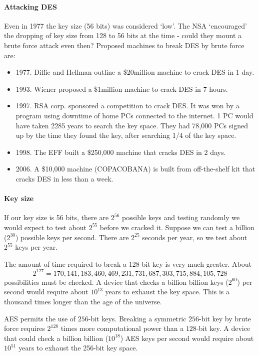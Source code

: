 \documentclass[a4paper, 11pt, openany]{book}
\numberwithin{equation}{section}
\theoremstyle{plain}
\theoremstyle{definition}
\begin{document}
\paragraph{Attacking DES}
Even in 1977 the key size (56 bits) was considered ‘low’.
The NSA ‘encouraged’ the dropping of key size from 128 to 56 bits at the time - could they mount a brute force attack even then?
Proposed machines to break DES by brute force are:
\begin{itemize}
    \item 1977. Diffie and Hellman outline a \$20million machine to crack DES in 1 day.
    
    \item 1993. Wiener proposed a \$1million machine to crack DES in 7 hours.
    
    \item 1997. RSA corp. sponsored a competition to crack DES. It was won by a program using downtime of home PCs connected to the internet. 1 PC would have taken 2285 years to search the key space. They had 78,000 PCs signed up by the time they found the key, after searching 1/4 of the key space.
    
    \item 1998. The EFF built a \$250,000 machine that cracks DES in 2 days.
    
    \item 2006. A \$10,000 machine (COPACOBANA) is built from off-the-shelf kit that cracks DES in less than a week.
\end{itemize}



\paragraph{Key size}
If our key size is 56 bits, there are $2^{56}$ possible keys and testing randomly we would expect to test about $2^{55}$ before we cracked it. Suppose we can test a billion ($2^{30}$) possible keys per second. There are $2^{25}$ seconds per year, so we test about $2^{55}$ keys per year. 

The amount of time required to break a 128-bit key is very much greater. About 
\[
    2^{127} = 170,141,183,460,469,231,731,687,303,715,884,105,728
\]
possibilities must be checked. A device that checks a billion billion keys ($2^{60}$) per second would require about $10^{13}$ years to exhaust the key space. This is a thousand times longer than the age of the universe.

AES permits the use of $256$-bit keys. Breaking a symmetric $256$-bit key by brute force requires $2^{128}$ times more computational power than a $128$-bit key. A device that could check a billion billion ($10^{18}$) AES keys per second would require about $10^{51}$ years to exhaust the 256-bit key space.
\end{document}
